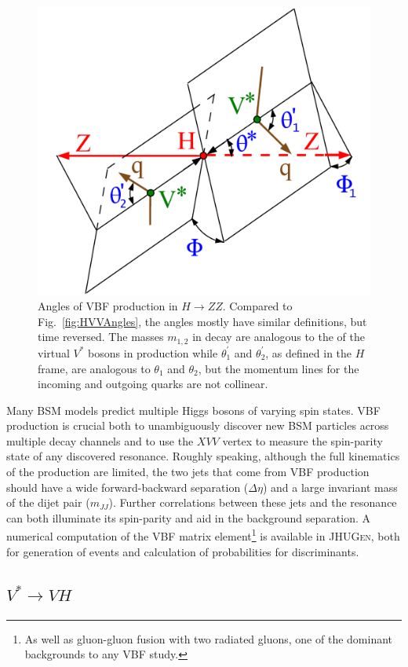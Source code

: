 \begin{figure}[htbp]
\begin{center}
\includegraphics[width=.5\linewidth]{Phenomenology/figures/angles-HZZVBF_cms.pdf}
\caption[Definition of Angles in VBF Production]{Angles of VBF production in $H\rightarrow ZZ$. Compared to Fig.~\ref{fig:HVVAngles}, the angles mostly have similar definitions, but time reversed. The masses $m_{1,2}$ in decay are analogous to the  of the virtual $V^*$ bosons in production while $\theta_1^{'}$ and $\theta_2^{'}$, as defined in the $H$ frame, are analogous to $\theta_1$ and $\theta_2$, but the momentum lines for the incoming and outgoing quarks are not collinear.}
\label{fig:VBFAngles}
\end{center}
\end{figure}

Many BSM models predict multiple Higgs bosons of varying spin states. VBF production is crucial both to unambiguously discover new BSM particles across multiple decay channels and to use the $XVV$ vertex to measure the spin-parity state of any discovered resonance. Roughly speaking, although the full kinematics of the production are limited, the two jets that come from VBF production should have a wide forward-backward separation ($\Delta\eta$) and a large invariant mass of the dijet pair ($m_{JJ}$). Further correlations between these jets and the resonance can both illuminate its spin-parity and aid in the background separation. A numerical computation of the VBF matrix element\footnote{As well as gluon-gluon fusion with two radiated gluons, one of the dominant backgrounds to any VBF study.} is available in \textsc{JHUGen}, both for generation of events and calculation of probabilities for discriminants.

\subsection{$V^* \rightarrow VH$}
\label{sec:VHVertex}

